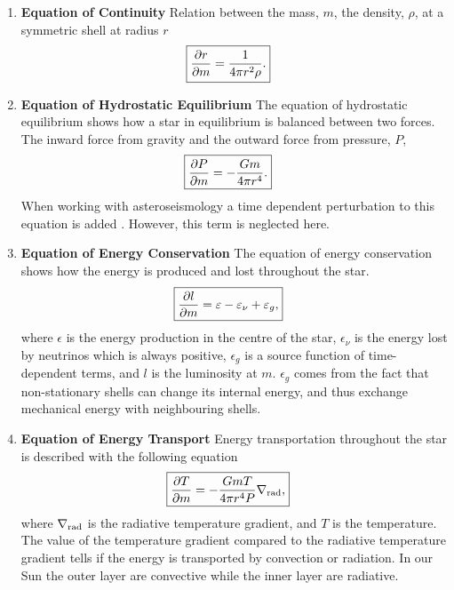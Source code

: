\begin{enumerate}
    \item \textbf{Equation of Continuity}
        \nicebreak
        Relation between the mass, $m$, the density, $\rho$, at a symmetric shell at radius $r$
        \begin{align}
            \Aboxed{\pd{r}{m} &= \frac{1}{4\pi r^2\rho}.}
        \end{align}

    \item \textbf{Equation of Hydrostatic Equilibrium}
        \nicebreak
        The equation of hydrostatic equilibrium shows how a star in equilibrium is balanced between
        two forces. The inward force from gravity and the outward force from pressure, $P$,
        \begin{align}
            \Aboxed{\pd{P}{m} &= -\frac{Gm}{4\pi r^4}.}
        \end{align}
        When working with asteroseismology a time dependent perturbation to this equation is added
        \citep[see e.g.][for a thorough discussion]{Aerts2010}. However, this term is neglected
        here.


    \item \textbf{Equation of Energy Conservation}
        \nicebreak
        The equation of energy conservation shows how the energy is produced and lost throughout the
        star.
        \begin{align}
            \Aboxed{\pd{l}{m} = \epsilon - \epsilon_\nu + \epsilon_g,}
        \end{align}
        where $\epsilon$ is the energy production in the centre of the star, $\epsilon_\nu$ is the
        energy lost by neutrinos which is always positive, $\epsilon_g$ is a source function of
        time-dependent terms, and $l$ is the luminosity at $m$. $\epsilon_g$ comes from the fact
        that non-stationary shells can change its internal energy, and thus exchange mechanical
        energy with neighbouring shells.

    \item \textbf{Equation of Energy Transport}
        \nicebreak
        Energy transportation throughout the star is described with the following equation
        \begin{align}
            \Aboxed{\pd{T}{m} &= -\frac{GmT}{4\pi r^4P}\nabla_\tm{rad},}
        \end{align}
        where $\nabla_{\textnormal{rad}}$ is the radiative temperature gradient, and $T$ is the temperature.
        The value of the temperature gradient compared to the radiative temperature gradient tells
        if the energy is transported by convection or radiation. In our Sun the outer layer are
        convective while the inner layer are radiative.


\end{enumerate}
